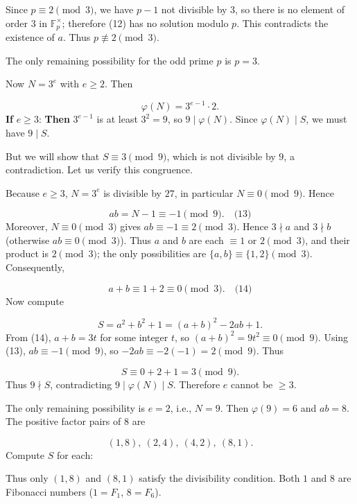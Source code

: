 Since \(p \equiv 2 \pmod{3}\), we have \(p-1\) not divisible by \(3\), so there is no element of order \(3\) in \(\mathbb{F}_p^{\times}\); therefore (12) has no solution modulo \(p\). This contradicts the existence of \(a\). Thus \(p \not\equiv 2 \pmod{3}\).\par
The only remaining possibility for the odd prime \(p\) is \(p = 3\).\par
{}
Now \(N = 3^{e}\) with \(e \ge 2\). Then\par
\[
\varphi(N) = 3^{e-1} \cdot 2.
\]
\textbf{If }\(e \ge 3\):\textbf{ Then }\(3^{e-1}\) is at least \(3^{2}=9\), so \(9 \mid \varphi(N)\). Since \(\varphi(N) \mid S\), we must have \(9 \mid S\).\par
But we will show that \(S \equiv 3 \pmod{9}\), which is not divisible by \(9\), a contradiction. Let us verify this congruence.\par
Because \(e \ge 3\), \(N = 3^{e}\) is divisible by \(27\), in particular \(N \equiv 0 \pmod{9}\). Hence\par
\[
ab = N-1 \equiv -1 \pmod{9}. \quad\text{(13)}
\]
Moreover, \(N \equiv 0 \pmod{3}\) gives \(ab \equiv -1 \equiv 2 \pmod{3}\). Hence \(3 \nmid a\) and \(3 \nmid b\) (otherwise \(ab \equiv 0 \pmod{3}\)). Thus \(a\) and \(b\) are each \(\equiv 1\) or \(2 \pmod{3}\), and their product is \(2 \pmod{3}\); the only possibilities are \(\{a,b\} \equiv \{1,2\} \pmod{3}\). Consequently,\par
\[
a + b \equiv 1 + 2 \equiv 0 \pmod{3}. \quad\text{(14)}
\]
Now compute\par
\[
S = a^{2}+b^{2}+1 = (a+b)^{2} - 2ab + 1.
\]
From (14), \(a+b = 3t\) for some integer \(t\), so \((a+b)^{2} = 9t^{2} \equiv 0 \pmod{9}\). Using (13), \(ab \equiv -1 \pmod{9}\), so \(-2ab \equiv -2(-1) = 2 \pmod{9}\). Thus\par
\[
S \equiv 0 + 2 + 1 = 3 \pmod{9}.
\]
Thus \(9 \nmid S\), contradicting \(9 \mid \varphi(N) \mid S\). Therefore \(e\) cannot be \(\ge 3\).\par
The only remaining possibility is \(e = 2\), i.e., \(N = 9\). Then \(\varphi(9) = 6\) and \(ab = 8\). The positive factor pairs of \(8\) are\par
\[
(1,8),\ (2,4),\ (4,2),\ (8,1).
\]
Compute \(S\) for each:\par
{}
Thus only \((1,8)\) and \((8,1)\) satisfy the divisibility condition. Both \(1\) and \(8\) are Fibonacci numbers (\(1 = F_1\), \(8 = F_6\)).\par
